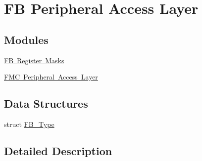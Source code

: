 \hypertarget{group___f_b___peripheral___access___layer}{}\section{FB Peripheral Access Layer}
\label{group___f_b___peripheral___access___layer}
\subsection*{Modules}
\begin{DoxyCompactItemize}
\item 
\mbox{\hyperlink{group___f_b___register___masks}{F\+B Register Masks}}
\item 
\mbox{\hyperlink{group___f_m_c___peripheral___access___layer}{F\+M\+C Peripheral Access Layer}}
\end{DoxyCompactItemize}
\subsection*{Data Structures}
\begin{DoxyCompactItemize}
\item 
struct \mbox{\hyperlink{struct_f_b___type}{F\+B\+\_\+\+Type}}
\end{DoxyCompactItemize}


\subsection{Detailed Description}
